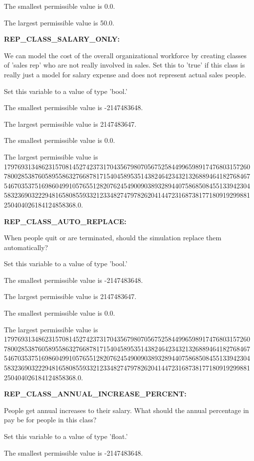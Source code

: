 The smallest permissible value is 0.0.

The largest permissible value is 50.0.


\textbf{REP\_CLASS\_SALARY\_ONLY:}


We can model the cost of the overall organizational workforce by creating classes of 'sales rep' who are not really involved in sales.  Set this to 'true' if this class is really just a model for salary expense and does not represent actual sales people.

Set this variable to a value of type 'bool.'

The smallest permissible value is -2147483648.

The largest permissible value is 2147483647.

The smallest permissible value is 0.0.

The largest permissible value is 179769313486231570814527423731704356798070567525844996598917476803157260780028538760589558632766878171540458953514382464234321326889464182768467546703537516986049910576551282076245490090389328944075868508455133942304583236903222948165808559332123348274797826204144723168738177180919299881250404026184124858368.0.


\textbf{REP\_CLASS\_AUTO\_REPLACE:}


When people quit or are terminated, should the simulation replace them automatically?

Set this variable to a value of type 'bool.'

The smallest permissible value is -2147483648.

The largest permissible value is 2147483647.

The smallest permissible value is 0.0.

The largest permissible value is 179769313486231570814527423731704356798070567525844996598917476803157260780028538760589558632766878171540458953514382464234321326889464182768467546703537516986049910576551282076245490090389328944075868508455133942304583236903222948165808559332123348274797826204144723168738177180919299881250404026184124858368.0.


\textbf{REP\_CLASS\_ANNUAL\_INCREASE\_PERCENT:}


People get annual increases to their salary.  What should the annual percentage in pay be for people in this class?

Set this variable to a value of type 'float.'

The smallest permissible value is -2147483648.

